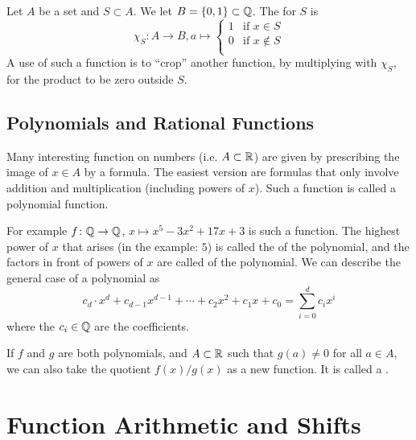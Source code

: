 Let $A$ be a set and $S\subset A$. We let $B=\{0,1\}\subset {\mathbb Q}$. The
 for $S$ is
\[
\chi_S\colon A\to B, a\mapsto\left\{\begin{array}{cl}
1&\mbox{if $x\in S$}\\
0&\mbox{if $x\not\in S$}\\
\end{array}
\right.
\]
A use of such a function is to ``crop'' another function, by multiplying with $\chi_S$,
for the product to be zero outside $S$.

\subsection{Polynomials and Rational Functions}

Many interesting function on numbers (i.e. $A\subset{\mathbb R}$) are given by
prescribing the image of $x\in A$ by a formula. The easiest version are
formulas that only involve addition and multiplication (including powers of
$x$). Such a function is called a polynomial function.

For example $f\colon{\mathbb Q}\to{\mathbb Q}$, $x\mapsto x^5-3x^2+17x+3$ is such a function.
The highest power of $x$ that arises (in the example: $5$) is called the
 of the polynomial, and the factors in front of powers of $x$
are called  of the polynomial.
We can describe the general case of a polynomial as
\[
c_d\cdot x^d+c_{d-1}x^{d-1}+\cdots+c_2x^2+c_1x+c_0=\sum_{i=0}^d c_ix^i
\]
where the $c_i\in{\mathbb Q}$ are the coefficients.
\bigskip

If $f$ and $g$ are both polynomials, and $A\subset{\mathbb R}$ such that $g(a)\not=0$
for all $a\in A$, we can also take the quotient $f(x)/g(x)$ as a new
function. It is called a .

\section{Function Arithmetic and Shifts}
\label{secfunari}

